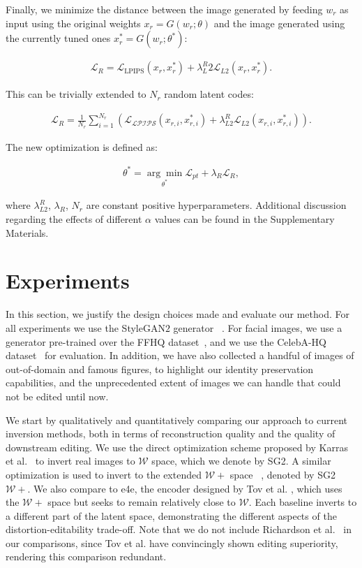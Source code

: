 Finally, we minimize the distance between the image generated by feeding $w_r$ as input using the original weights $x_r = G(w_r; \theta)$ and the image generated using the currently tuned ones $x_r^* = G(w_r; \theta^*)$:

\begin{align}
\mathcal{L}_{R} =  \mathcal{L}_{\text{LPIPS}}(x_r,x_r^*) + \lambda^R_L2\mathcal{L}_{L2}(x_r, x_r^*).
\end{align}

This can be trivially extended to $N_r$ random latent codes:

\begin{align}
\mathcal{L}_{R} = \frac{1}{N_r}\sum^{N_r}_{i=1} (\mathcal{L_{\text{LPIPS}}}(x_{r,i},x_{r,i}^*) + \lambda^R_{L2}\mathcal{L}_{L2}(x_{r,i}, x_{r,i}^*)).
\end{align}

The new optimization is defined as:

\begin{align}
\theta^* = \underset{\theta^*}{\arg\min} \mathcal{L}_{pt} + \lambda_R \mathcal{L}_{R},
\end{align}

where $\lambda^R_{L2}$, $\lambda_R$, $N_r$ are constant positive hyperparameters. Additional discussion regarding the effects of different $\alpha$ values can be found in the Supplementary Materials.

\section{Experiments}
\label{sec:experiments}

In this section, we justify the design choices made and evaluate our method. For all experiments we use the StyleGAN$2$ generator ~\cite{karras2020analyzing}. For facial images, we use a generator pre-trained over the FFHQ dataset~\cite{karras2019style}, and we use the CelebA-HQ dataset~\cite{liu2015faceattributes, karras2017progressive} for evaluation. In addition, we have also collected a handful of images of out-of-domain and famous figures, to highlight our identity preservation capabilities, and the unprecedented extent of images we can handle that could not be edited until now.

We start by qualitatively and quantitatively comparing our approach to current inversion methods, both in terms of reconstruction quality and the quality of downstream editing. We use the direct optimization scheme proposed by Karras et al.~\cite{karras2020analyzing} to invert real images to $\mathcal{W}$ space, which we denote by SG2. A similar optimization is used to invert to the extended $\mathcal{W+}$ space ~\cite{abdal2019image2stylegan}, denoted by SG2 $\mathcal{W+}$. We also compare to e4e, the encoder designed by Tov et al. \cite{tov2021designing}, which uses the $\mathcal{W+}$ space but seeks to remain relatively close to $\mathcal{W}$. Each baseline inverts to a different part of the latent space, demonstrating the different aspects of the distortion-editability trade-off. Note that we do not include Richardson et al.~\cite{richardson2020encoding} in our comparisons, since Tov et al. have convincingly shown editing superiority, rendering this comparison redundant. 

